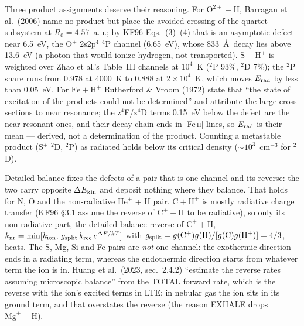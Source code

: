 \documentclass[english,a4paper]{my_memo}
\begin{document}
Three product assignments deserve their reasoning.  For
$\mathrm{O}^{2+} + \mathrm{H}$, Barragan et al.\ (2006) name no product but
place the avoided crossing of the quartet subsystem at $R_0 = 4.57$~a.u.;
by KF96 Eqs.~(3)--(4) that is an asymptotic defect near 6.5~eV, the
O$^+$ 2s2p$^4$ $^4$P channel (6.65~eV), whose 833~\AA\ decay lies above
13.6~eV (a photon that would ionize hydrogen, not transported).
$\mathrm{S} + \mathrm{H}^+$ is weighted over Zhao et al.'s Table~III
channels at $10^4$~K ($^2$P 93\%, $^2$D 7\%); the $^2$P share runs from 0.978
at 4000~K to 0.888 at $2{\times}10^4$~K, which moves $E_{\rm rad}$ by less
than 0.05~eV.  For $\mathrm{Fe} + \mathrm{H}^+$ Rutherford \& Vroom (1972)
state that ``the state of excitation of the products could not be
determined'' and attribute the large cross sections to near resonance; the
z$^4$F/z$^4$D terms 0.15~eV below the defect are the near-resonant ones, and
their decay chain ends in [Fe\,\textsc{ii}] lines, so $E_{\rm rad}$ is their
mean --- derived, not a determination of the product.  Counting a
metastable product (S$^+$ $^2$D, $^2$P) as radiated holds below its critical
density ($\sim$$10^3$~cm$^{-3}$ for $^2$D).

Detailed balance fixes the defects of a pair that is one channel and its
reverse: the two carry opposite $\Delta E_{\rm kin}$ and deposit nothing
where they balance.  That holds for N, O and the non-radiative He$^+$ + H
pair.  $\mathrm{C} + \mathrm{H}^+$ is mostly radiative charge transfer
(KF96 \S3.1 assume the reverse of $\mathrm{C}^+ + \mathrm{H}$ to be
radiative), so only its non-radiative part, the detailed-balance reverse of
$\mathrm{C}^+ + \mathrm{H}$,
$k_{\rm nr} = \min[k_{\rm ion},\, g_{\rm split}\,k_{\rm rec}\,
e^{\Delta E/kT}]$ with $g_{\rm split} = g({\rm C^+})g({\rm H})/
[g({\rm C})g({\rm H^+})] = 4/3$, heats.  The S, Mg, Si and Fe pairs are
\emph{not} one channel: the exothermic direction ends in a radiating
term, whereas the endothermic direction starts from whatever term the ion
is in.  Huang et al.\ (2023, sec.~2.4.2) ``estimate the reverse rates
assuming microscopic balance'' from the TOTAL forward rate, which is the
reverse with the ion's excited terms in LTE; in nebular gas the ion sits in
its ground term, and that overstates the reverse (the reason EXHALE drops
$\mathrm{Mg}^+ + \mathrm{H}$).
\end{document}
